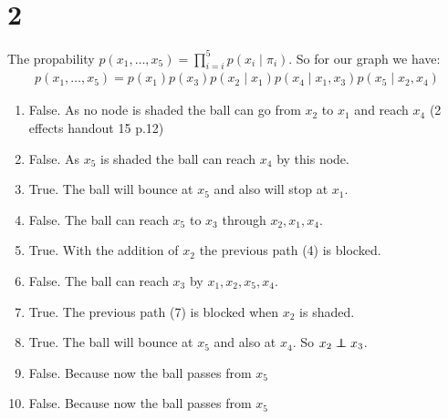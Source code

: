 \section*{2}
The propability $p(x_1,\dotsc,x_5) = \prod_{i=i}^5 p(x_i\mid \pi_i)$.
So for our graph we have:
\begin{align*}
p(x_1,\dotsc,x_5) = p(x_1)p(x_3)p(x_2\mid x_1)p(x_4\mid x_{1},x_3)p(x_5\mid x_{2},x_4)
\end{align*}
\begin{enumerate}
\item False. As no node is shaded the ball can go from $x_2$ to $x_1$ and reach $x_4$ (2 effects handout 15 p.12)
\item False. As $x_5$ is shaded the ball can reach $x_4$ by this node.
\item True. The ball will bounce at $x_5$ and also will stop at $x_1$.
\item False. The ball can reach $x_5$ to $x_3$ through $x_2, x_1, x_4$.
\item True. With the addition of $x_2$ the previous path (4) is blocked.
\item False. The ball can reach $x_3$ by $x_1, x_2, x_5, x_4$.
\item True. The previous path (7) is blocked when $x_2$ is shaded.
\item True. The ball will bounce at $x_5$ and also at $x_4$. So $x_2 \independent x_3$. 
\item False. Because now the ball passes from $x_5$
\item False. Because now the ball passes from $x_5$
\end{enumerate}
